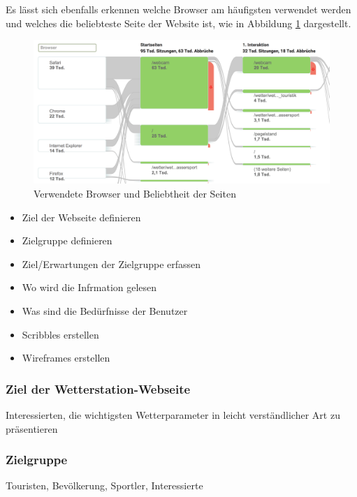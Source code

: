 Es lässt sich ebenfalls erkennen welche Browser am häufigsten verwendet werden und welches die beliebteste Seite der Website ist, wie in Abbildung \ref{img:google_browser} dargestellt.

\begin{figure}[h!]
	\centering
	\includegraphics[width=1\linewidth]{img/google_browser}
	\caption{Verwendete Browser und Beliebtheit der Seiten}
	\label{img:google_browser}
\end{figure}


\newline
{}\newline



\begin{itemize}
\item Ziel der Webseite definieren
\item Zielgruppe definieren
\item Ziel/Erwartungen der Zielgruppe erfassen
\item Wo wird die Infrmation gelesen
\item Was sind die Bedürfnisse der Benutzer
\item Scribbles erstellen
\item Wireframes erstellen
\end{itemize}

\subsubsection*{Ziel der Wetterstation-Webseite}
Interessierten, die wichtigsten Wetterparameter in leicht verständlicher Art zu präsentieren
\subsubsection*{Zielgruppe}
Touristen, Bevölkerung, Sportler, Interessierte
